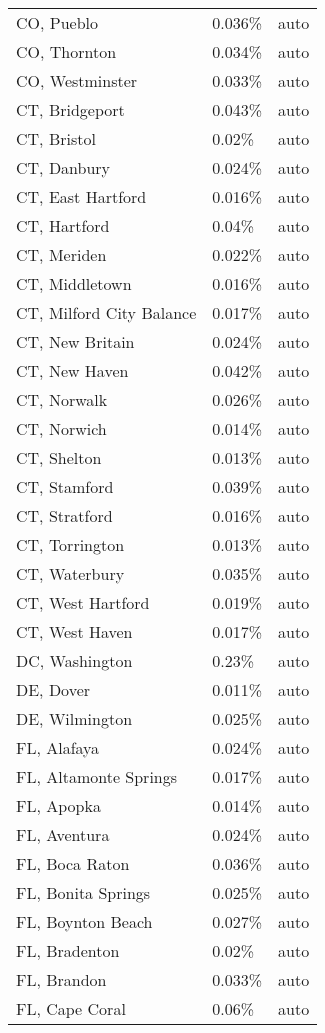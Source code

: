 \begin{longtable}[]{@{}lll@{}}
CO, Pueblo & 0.036\% & auto \\
CO, Thornton & 0.034\% & auto \\
CO, Westminster & 0.033\% & auto \\
CT, Bridgeport & 0.043\% & auto \\
CT, Bristol & 0.02\% & auto \\
CT, Danbury & 0.024\% & auto \\
CT, East Hartford & 0.016\% & auto \\
CT, Hartford & 0.04\% & auto \\
CT, Meriden & 0.022\% & auto \\
CT, Middletown & 0.016\% & auto \\
CT, Milford City Balance & 0.017\% & auto \\
CT, New Britain & 0.024\% & auto \\
CT, New Haven & 0.042\% & auto \\
CT, Norwalk & 0.026\% & auto \\
CT, Norwich & 0.014\% & auto \\
CT, Shelton & 0.013\% & auto \\
CT, Stamford & 0.039\% & auto \\
CT, Stratford & 0.016\% & auto \\
CT, Torrington & 0.013\% & auto \\
CT, Waterbury & 0.035\% & auto \\
CT, West Hartford & 0.019\% & auto \\
CT, West Haven & 0.017\% & auto \\
DC, Washington & 0.23\% & auto \\
DE, Dover & 0.011\% & auto \\
DE, Wilmington & 0.025\% & auto \\
FL, Alafaya & 0.024\% & auto \\
FL, Altamonte Springs & 0.017\% & auto \\
FL, Apopka & 0.014\% & auto \\
FL, Aventura & 0.024\% & auto \\
FL, Boca Raton & 0.036\% & auto \\
FL, Bonita Springs & 0.025\% & auto \\
FL, Boynton Beach & 0.027\% & auto \\
FL, Bradenton & 0.02\% & auto \\
FL, Brandon & 0.033\% & auto \\
FL, Cape Coral & 0.06\% & auto \\

\end{longtable}
